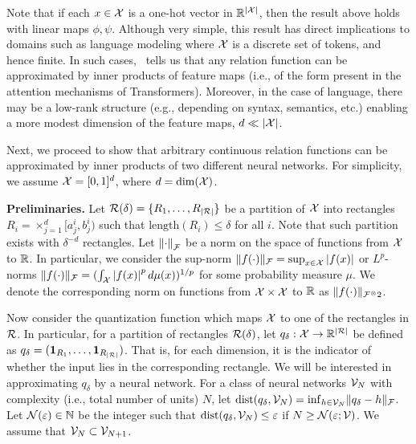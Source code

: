 Note that if each $x \in {\mathcal{X}}$ is a one-hot vector in $\mathbb{R}^{\left\lvert{\mathcal{X}}\right\rvert}$, then the result above holds with linear maps $\phi, \psi$. Although very simple, this result has direct implications to domains such as language modeling where ${\mathcal{X}}$ is a discrete set of tokens, and hence finite. In such cases,~ tells us that any relation function can be approximated by inner products of feature maps (i.e., of the form present in the attention mechanisms of Transformers). Moreover, in the case of language, there may be a low-rank structure (e.g., depending on syntax, semantics, etc.) enabling a more modest dimension of the feature maps, $d \ll \left\lvert{\mathcal{X}}\right\rvert$.

Next, we proceed to show that arbitrary continuous relation functions can be approximated by inner products of two different neural networks. For simplicity, we assume ${\mathcal{X}} = [0, 1]^{d}$, where $d = \mathrm{dim}({\mathcal{X}})$.

\textbf{Preliminaries.} Let ${\mathcal{R}}(\delta) = \{R_1, \ldots, R_{\lvert{\mathcal{R}}\rvert}\}$ be a partition of ${\mathcal{X}}$ into rectangles $R_i = \times_{j=1}^{d} [a_j^i, b_j^i)$ such that $\mathrm{length}(R_i) \leq \delta$ for all $i$. Note that such partition exists with $\delta^{-d}$ rectangles. Let $\left\lVert\cdot\right\rVert_{\mathcal{F}}$ be a norm on the space of functions from ${\mathcal{X}}$ to $\mathbb{R}$. In particular, we consider the sup-norm $\lVert f(\cdot)\rVert_{\mathcal{F}} = \sup_{x \in {\mathcal{X}}} \left\lvert f(x)\right\rvert$ or $L^p$-norms $\lVert f(\cdot)\rVert_{\mathcal{F}} = (\int_{\mathcal{X}} \left\lvert f(x)\right\rvert^p d\mu(x))^{1/p}$ for some probability measure $\mu$. We denote the corresponding norm on functions from ${\mathcal{X}} \times {\mathcal{X}}$ to $\mathbb{R}$ as $\lVert f(\cdot)\rVert_{{\mathcal{F}}^\otimes 2}$.%

Now consider the quantization function which maps ${\mathcal{X}}$ to one of the rectangles in ${\mathcal{R}}$. In particular, for a partition of rectangles ${\mathcal{R}}(\delta)$, let $q_\delta: {\mathcal{X}} \to \mathbb{R}^{\lvert{\mathcal{R}}\rvert}$ be defined as $q_\delta = (\bm{1}_{R_1}, \ldots, \bm{1}_{R_{\lvert{\mathcal{R}}\rvert}})$. That is, for each dimension, it is the indicator of whether the input lies in the corresponding rectangle. We will be interested in approximating $q_\delta$ by a neural network. For a class of neural networks ${\mathcal{V}}_N$ with complexity (i.e., total number of units) $N$, let $\mathrm{dist}(q_\delta, {\mathcal{V}}_N) = \inf_{h \in {\mathcal{V}}_N} \lVert q_\delta - h\rVert_{\mathcal{F}}$. Let ${\mathcal{N}}(\varepsilon) \in \mathbb{N}$ be the integer such that $\mathrm{dist}(q_\delta, {\mathcal{V}}_N) \leq \varepsilon$ if $N \geq {\mathcal{N}}(\varepsilon; {\mathcal{V}})$. We assume that ${\mathcal{V}}_N \subset {\mathcal{V}}_{N+1}$.


